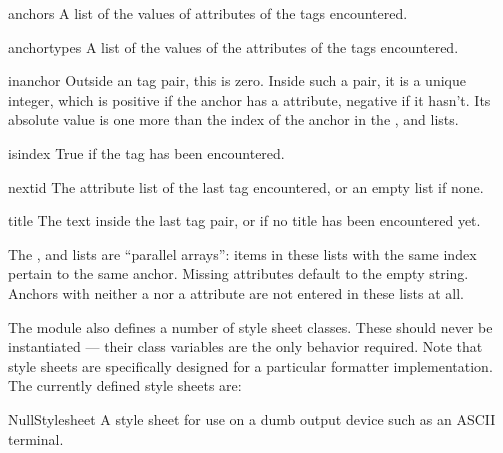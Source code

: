 \begin{datadesc}{anchors}
A list of the values of  attributes of the  tags
encountered.
\end{datadesc}

\begin{datadesc}{anchortypes}
A list of the values of the  attributes of the 
tags encountered.
\end{datadesc}

\begin{datadesc}{inanchor}
Outside an  tag pair, this is zero.  Inside such a
pair, it is a unique integer, which is positive if the anchor has a
 attribute, negative if it hasn't.  Its absolute value is
one more than the index of the anchor in the ,
 and  lists.
\end{datadesc}

\begin{datadesc}{isindex}
True if the  tag has been encountered.
\end{datadesc}

\begin{datadesc}{nextid}
The attribute list of the last  tag encountered, or
an empty list if none.
\end{datadesc}

\begin{datadesc}{title}
The text inside the last  tag pair, or
 if no title has been encountered yet.
\end{datadesc}

The ,  and  lists
are ``parallel arrays'': items in these lists with the same index
pertain to the same anchor.  Missing attributes default to the empty
string.  Anchors with neither a  nor a 
attribute are not entered in these lists at all.

The module also defines a number of style sheet classes.  These should
never be instantiated --- their class variables are the only behavior
required.  Note that style sheets are specifically designed for a
particular formatter implementation.  The currently defined style
sheets are:

\begin{datadesc}{NullStylesheet}
A style sheet for use on a dumb output device such as an ASCII
terminal.
\end{datadesc}

